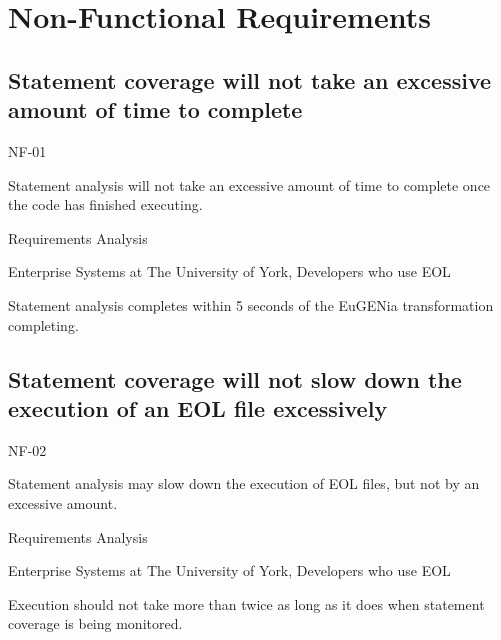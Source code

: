 \section{Non-Functional Requirements}


\subsection{Statement coverage will not take an excessive amount of time to complete}
\begin{description}[style=sameline,leftmargin=4.5cm,nolistsep]
\item[\hspace*{0.3cm}Label] NF-01
\item[\hspace*{0.3cm}Description] Statement analysis will not take an excessive amount of time to complete once the code has finished executing.
\item[\hspace*{0.3cm}Source] Requirements Analysis
\item[\hspace*{0.3cm}Stakeholders] Enterprise Systems at The University of York, Developers who use EOL
\item[\hspace*{0.3cm}Satisfiable Conditions] Statement analysis completes within 5 seconds of the EuGENia transformation completing.
\end{description}

\subsection{Statement coverage will not slow down the execution of an EOL file excessively}
\begin{description}[style=sameline,leftmargin=4.5cm,nolistsep]
\item[\hspace*{0.3cm}Label] NF-02
\item[\hspace*{0.3cm}Description] Statement analysis may slow down the execution of EOL files, but not by an excessive amount.
\item[\hspace*{0.3cm}Source] Requirements Analysis
\item[\hspace*{0.3cm}Stakeholders] Enterprise Systems at The University of York, Developers who use EOL
\item[\hspace*{0.3cm}Satisfiable Conditions] Execution should not take more than twice as long as it does when statement coverage is being monitored.
\end{description}

